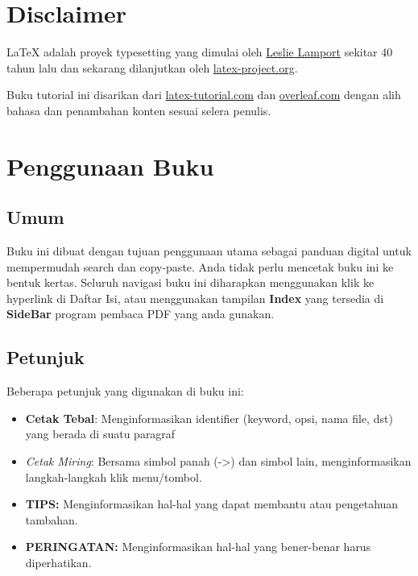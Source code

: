 \documentclass{book} %
\begin{document}
    \newpage
    \chapter{Disclaimer} %

    \LaTeX{} adalah proyek typesetting yang dimulai oleh \href{https://en.wikipedia.org/wiki/Leslie_Lamport}{Leslie Lamport}
    sekitar 40 tahun lalu dan sekarang dilanjutkan oleh \href{https://www.latex-project.org/}{latex-project.org}.

    \bigskip %

    Buku tutorial ini disarikan dari \href{https://latex-tutorial.com/tutorials}{latex-tutorial.com}
    dan \href{https://www.overleaf.com/learn/latex/Tutorials}{overleaf.com} dengan alih bahasa dan penambahan konten sesuai selera penulis.


	\newpage
	\chapter{Penggunaan Buku}

	\section{Umum} %
	Buku ini dibuat dengan tujuan penggunaan utama sebagai panduan digital untuk mempermudah search dan copy-paste.
	Anda tidak perlu mencetak buku ini ke bentuk kertas.
	Seluruh navigasi buku ini diharapkan menggunakan klik ke hyperlink di Daftar Isi,
	atau menggunakan tampilan \textbf{Index} yang tersedia di \textbf{SideBar} program pembaca PDF yang anda gunakan.

	\section{Petunjuk}
	Beberapa petunjuk yang digunakan di buku ini:
	\begin{itemize} %
		\item \textbf{Cetak Tebal}: Menginformasikan identifier (keyword, opsi, nama file, dst) yang berada di suatu paragraf
		\item \textit{Cetak Miring}: Bersama simbol panah (->) dan simbol lain, menginformasikan langkah-langkah klik menu/tombol.
		\item \textbf{TIPS:} Menginformasikan hal-hal yang dapat membantu atau pengetahuan tambahan.
		\item \textbf{PERINGATAN:} Menginformasikan hal-hal yang bener-benar harus diperhatikan.
	\end{itemize}
\end{document}
